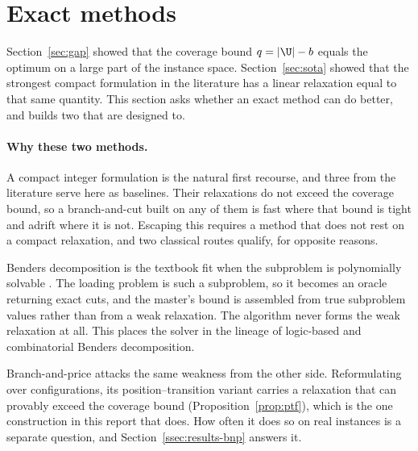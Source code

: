 \section{Exact methods}\label{sec:exact}

Section~\ref{sec:gap} showed that the coverage bound $q=\lvert\U\rvert-b$ equals the
optimum on a large part of the instance space. Section~\ref{sec:sota} showed that the
strongest compact formulation in the literature has a linear relaxation equal to that
same quantity. This section asks whether an exact method can do better, and builds
two that are designed to.

\paragraph{Why these two methods.}
A compact integer formulation is the natural first recourse, and three from the
literature serve here as baselines. Their relaxations do not exceed the coverage
bound, so a branch-and-cut built on any of them is fast where that bound is tight and
adrift where it is not. Escaping this requires a method that does not rest on a
compact relaxation, and two classical routes qualify, for opposite reasons.

Benders decomposition is the textbook fit when the subproblem is polynomially
solvable \citep{Rahmaniani2017}. The loading problem is such a subproblem, so it
becomes an oracle returning exact cuts, and the master's bound is assembled from true
subproblem values rather than from a weak relaxation. The algorithm never forms the
weak relaxation at all. This places the solver in the lineage of logic-based
\citep{Hooker2003} and combinatorial \citep{Codato2006} Benders decomposition.

Branch-and-price attacks the same weakness from the other side. Reformulating over
configurations, its position--transition variant carries a relaxation that can provably
exceed the coverage bound (Proposition~\ref{prop:ptf}), which is the one construction in
this report that does. How often it does so on real instances is a separate question,
and Section~\ref{ssec:results-bnp} answers it.

